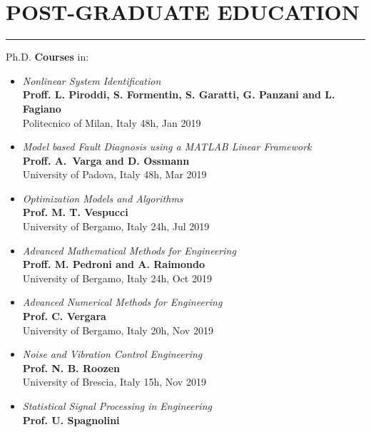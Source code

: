 \documentclass[10pt]{article}
\newcommand{\cvsection}[1]{\section*{\centering\normalsize\uppercase{#1}}\vspace{-16pt}\rule{\linewidth}{0.2pt}\vspace{6pt}}
\begin{document}
\cvsection{post-graduate education}
Ph.D. \textbf{Courses} in:
\begin{itemize}	
	\setlength\itemsep{-3pt}
	\renewcommand\labelitemi{$\vcenter{\hbox{\tiny$\bullet$}}$}
	\item \textit{Nonlinear System Identification} \\
	\textbf{Proff. L. Piroddi, S. Formentin, S. Garatti, G. Panzani and L. Fagiano}\\
	Politecnico of Milan, Italy \hfill 48h, Jan 2019 \\
	\item \textit{Model based Fault Diagnosis using a MATLAB Linear Framework}\\
	\textbf{Proff. A. Varga and D. Ossmann}\\
	University of Padova, Italy \hfill 48h, Mar 2019\\
	\item \textit{Optimization Models and Algorithms} \\
	\textbf{Prof. M. T. Vespucci}\\
	University of Bergamo, Italy \hfill 24h, Jul 2019\\
	\item \textit{Advanced Mathematical Methods for Engineering}\\
	\textbf{Proff. M. Pedroni and A. Raimondo}\\
	University of Bergamo, Italy \hfill 24h, Oct 2019\\
	\item \textit{Advanced Numerical Methods for Engineering}\\
	\textbf{Prof. C. Vergara}\\
	University of Bergamo, Italy \hfill 20h, Nov 2019\\
	\item \textit{Noise and Vibration Control Engineering}\\
	\textbf{Prof. N. B. Roozen}\\
	University of Brescia, Italy \hfill 15h, Nov 2019\\
	\item \textit{Statistical Signal Processing in Engineering}\\
	\textbf{Prof. U. Spagnolini}\\

\end{itemize}
\end{document}
